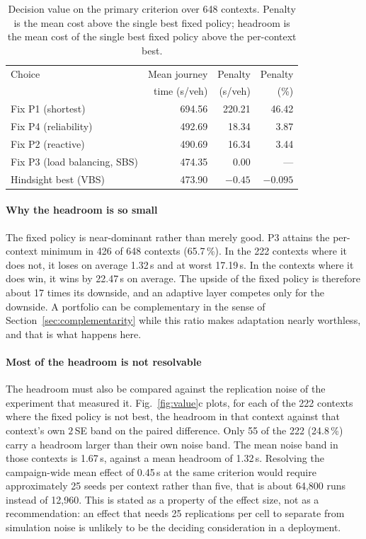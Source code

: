 \begin{table}[htbp]
\centering\small
\caption{Decision value on the primary criterion over 648 contexts. Penalty is
the mean cost above the single best fixed policy; headroom is the mean cost of
the single best fixed policy above the per-context best.}
\label{tab:value}
\begin{tabular}{@{}lrrr@{}}
\toprule
Choice & Mean journey & Penalty & Penalty\\
 & time (s/veh) & (s/veh) & (\%)\\
\midrule
Fix P1 (shortest) & 694.56 & 220.21 & 46.42\\
Fix P4 (reliability) & 492.69 & 18.34 & 3.87\\
Fix P2 (reactive) & 490.69 & 16.34 & 3.44\\
Fix P3 (load balancing, SBS) & 474.35 & 0.00 & ---\\
\midrule
Hindsight best (VBS) & 473.90 & $-0.45$ & $-0.095$\\
\bottomrule
\end{tabular}
\end{table}

\paragraph{Why the headroom is so small}
The fixed policy is near-dominant rather than merely good. P3 attains the
per-context minimum in 426 of 648 contexts (65.7\,\%). In the 222 contexts where
it does not, it loses on average 1.32\,s and at worst 17.19\,s. In the contexts
where it does win, it wins by 22.47\,s on average. The upside of the fixed policy
is therefore about 17 times its downside, and an adaptive layer competes only
for the downside. A portfolio can be complementary in the sense of
Section~\ref{sec:complementarity} while this ratio makes adaptation nearly
worthless, and that is what happens here.

\paragraph{Most of the headroom is not resolvable}
The headroom must also be compared against the replication noise of the
experiment that measured it. Fig.~\ref{fig:value}c plots, for each of the 222
contexts where the fixed policy is not best, the headroom in that context against
that context's own $2\,$SE band on the paired difference. Only 55 of the 222
(24.8\,\%) carry a headroom larger than their own noise band. The mean noise band
in those contexts is 1.67\,s, against a mean headroom of 1.32\,s. Resolving the
campaign-wide mean effect of 0.45\,s at the same criterion would require
approximately 25 seeds per context rather than five, that is about 64{,}800 runs
instead of 12{,}960. This is stated as a property of the effect size, not as a
recommendation: an effect that needs 25 replications per cell to separate from
simulation noise is unlikely to be the deciding consideration in a deployment.

